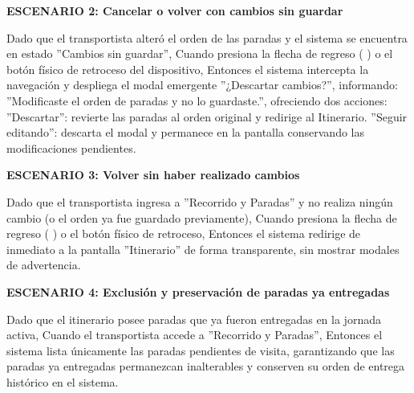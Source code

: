 \documentclass[a4paper,9pt]{article}
\begin{document}
\begin{tcolorbox}[hucard, title={\textbf{HU-24: REORDENAR PARADAS} \hfill \scriptsize \colorbox{tealstatus}{\textbf{\ Accepted\ }} \quad \colorbox{white}{\textcolor{primarydark}{\textbf{\ 3 pts\ }}}}]
{\noindent\textbf{\textcolor{secondarydark}{ESCENARIO 2:  Cancelar o volver con cambios sin guardar}}\par\vspace{1pt}
Dado que el transportista alteró el orden de las paradas y el sistema se encuentra en estado ''Cambios sin guardar'', Cuando presiona la flecha de regreso ( ) o el botón físico de retroceso del dispositivo, Entonces el sistema intercepta la navegación y despliega el modal emergente ''¿Descartar cambios?'', informando: ''Modificaste el orden de paradas y no lo guardaste.'', ofreciendo dos acciones: ''Descartar'': revierte las paradas al orden original y redirige al Itinerario. ''Seguir editando'': descarta el modal y permanece en la pantalla conservando las modificaciones pendientes.\par\vspace{2.5pt}
\noindent\textbf{\textcolor{secondarydark}{ESCENARIO 3:  Volver sin haber realizado cambios}}\par\vspace{1pt}
Dado que el transportista ingresa a ''Recorrido y Paradas'' y no realiza ningún cambio (o el orden ya fue guardado previamente), Cuando presiona la flecha de regreso ( ) o el botón físico de retroceso, Entonces el sistema redirige de inmediato a la pantalla ''Itinerario'' de forma transparente, sin mostrar modales de advertencia.\par\vspace{2.5pt}
\noindent\textbf{\textcolor{secondarydark}{ESCENARIO 4:  Exclusión y preservación de paradas ya entregadas}}\par\vspace{1pt}
Dado que el itinerario posee paradas que ya fueron entregadas en la jornada activa, Cuando el transportista accede a ''Recorrido y Paradas'', Entonces el sistema lista únicamente las paradas pendientes de visita, garantizando que las paradas ya entregadas permanezcan inalterables y conserven su orden de entrega histórico en el sistema.\par\vspace{2.5pt}
}\par
\end{tcolorbox}
\end{document}

